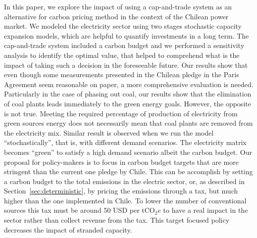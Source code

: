 \documentclass[11pt, letterpaper]{article}
\begin{document}
In this paper, we explore the impact of using a cap-and-trade system as an alternative for carbon pricing method in the context of the Chilean power market. We modeled the electricity sector using two stages stochastic capacity expansion models, which are helpful to quantify investments in a long term. The cap-and-trade system included a carbon budget and we performed a sensitivity analysis to identify the optimal value, that helped to comprehend what is the impact of taking such a decision in the foreseeable future. Our results show that even though some measurements presented in the Chilean pledge in the Paris Agreement seem reasonable on paper, a more comprehensive evaluation is needed. Particularly in the case of phasing out coal, our results show that the elimination of coal plants leads immediately to the green energy goals. However, the opposite is not true. Meeting the required percentage of production of electricity from green sources energy does not necessarily mean that coal plants are removed from the electricity mix. Similar result is observed when we run the model ``stochastically'', that is, with different demand scenarios. The electricity matrix becomes ``green''  to satisfy a high demand scenario albeit the carbon budget. 
Our proposal for policy-makers is to focus in carbon budget targets that are more stringent than the current one pledge by Chile. This can be accomplish by setting a carbon budget to the total emissions in the electric sector, or, as described in Section~\ref{sec:deterministic}, by pricing the emissions through a tax, but much higher than the one implemented in Chile. To lower the number of conventional sources this tax must be around 50 USD per tCO$_2e$ to have a real impact in the sector rather than collect revenue from the tax.  This target focused policy decreases the impact of stranded capacity. 
\end{document}
